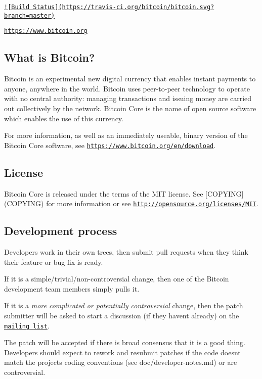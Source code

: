 \href{https://travis-ci.org/bitcoin/bitcoin}{\tt !\mbox{[}Build Status\mbox{]}(https\+://travis-\/ci.\+org/bitcoin/bitcoin.\+svg?branch=master)}

\href{https://www.bitcoin.org}{\tt https\+://www.\+bitcoin.\+org}

\subsection*{What is Bitcoin? }

Bitcoin is an experimental new digital currency that enables instant payments to anyone, anywhere in the world. Bitcoin uses peer-\/to-\/peer technology to operate with no central authority\+: managing transactions and issuing money are carried out collectively by the network. Bitcoin Core is the name of open source software which enables the use of this currency.

For more information, as well as an immediately useable, binary version of the Bitcoin Core software, see \href{https://www.bitcoin.org/en/download}{\tt https\+://www.\+bitcoin.\+org/en/download}.

\subsection*{License }

Bitcoin Core is released under the terms of the M\+I\+T license. See \mbox{[}C\+O\+P\+Y\+I\+N\+G\mbox{]}(C\+O\+P\+Y\+I\+N\+G) for more information or see \href{http://opensource.org/licenses/MIT}{\tt http\+://opensource.\+org/licenses/\+M\+I\+T}.

\subsection*{Development process }

Developers work in their own trees, then submit pull requests when they think their feature or bug fix is ready.

If it is a simple/trivial/non-\/controversial change, then one of the Bitcoin development team members simply pulls it.

If it is a {\itshape more complicated or potentially controversial} change, then the patch submitter will be asked to start a discussion (if they haven\textquotesingle{}t already) on the \href{http://sourceforge.net/mailarchive/forum.php?forum_name=bitcoin-development}{\tt mailing list}.

The patch will be accepted if there is broad consensus that it is a good thing. Developers should expect to rework and resubmit patches if the code doesn\textquotesingle{}t match the project\textquotesingle{}s coding conventions (see doc/developer-\/notes.md) or are controversial.

